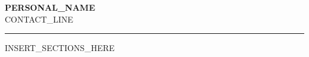 \documentclass[letter,10pt]{article}
\begin{document}
{\Huge\bfseries {{PERSONAL_NAME}}}\\[3pt]
{\small\color{highlight} {{CONTACT_LINE}}}\\[2pt]
\rule{\textwidth}{2pt}
\vspace{6pt}

{{INSERT_SECTIONS_HERE}}
\end{document}
